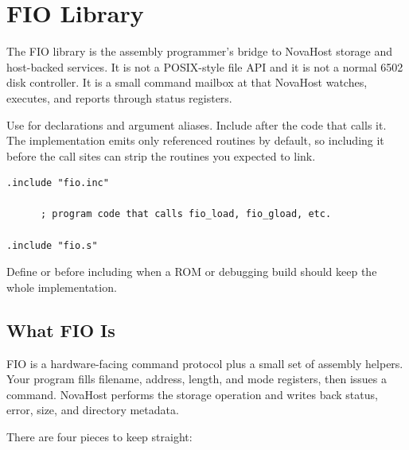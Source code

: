 \chapter{FIO Library}

The FIO library is the assembly programmer's bridge to NovaHost storage and
host-backed services. It is not a POSIX-style file API and it is not a normal
6502 disk controller. It is a small command mailbox at 
that NovaHost watches, executes, and reports through status registers.

\begin{novanote}
Use  for declarations and argument aliases. Include
 after the code that calls it. The implementation emits only
referenced routines by default, so including it before the call sites can strip
the routines you expected to link.
\end{novanote}

\begin{lstlisting}
.include "fio.inc"

      ; program code that calls fio_load, fio_gload, etc.

.include "fio.s"
\end{lstlisting}

Define  or
 before including  when a ROM
or debugging build should keep the whole implementation.

\section{What FIO Is}

FIO is a hardware-facing command protocol plus a small set of assembly helpers.
Your program fills filename, address, length, and mode registers, then issues a
command. NovaHost performs the storage operation and writes back status, error,
size, and directory metadata.

\begin{center}
\end{center}

There are four pieces to keep straight:

